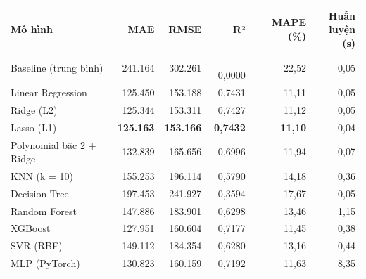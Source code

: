 \begin{tabular}{lrrrrr}
\toprule
Mô hình & MAE & RMSE & R² & MAPE (\%) & \makecell[r]{Huấn\\luyện (s)} \\
\midrule
Baseline (trung bình) & 241{.}164 & 302{.}261 & \ensuremath{-}0{,}0000 & 22{,}52 & 0{,}05 \\
Linear Regression & 125{.}450 & 153{.}188 & 0{,}7431 & 11{,}11 & 0{,}05 \\
Ridge (L2) & 125{.}344 & 153{.}311 & 0{,}7427 & 11{,}12 & 0{,}05 \\
Lasso (L1) & \textbf{125{.}163} & \textbf{153{.}166} & \textbf{0{,}7432} & \textbf{11{,}10} & 0{,}04 \\
Polynomial bậc 2 + Ridge & 132{.}839 & 165{.}656 & 0{,}6996 & 11{,}94 & 0{,}07 \\
KNN (k = 10) & 155{.}253 & 196{.}114 & 0{,}5790 & 14{,}18 & 0{,}36 \\
Decision Tree & 197{.}453 & 241{.}927 & 0{,}3594 & 17{,}67 & 0{,}05 \\
Random Forest & 147{.}886 & 183{.}901 & 0{,}6298 & 13{,}46 & 1{,}15 \\
XGBoost & 127{.}951 & 160{.}604 & 0{,}7177 & 11{,}45 & 0{,}38 \\
SVR (RBF) & 149{.}112 & 184{.}354 & 0{,}6280 & 13{,}16 & 0{,}44 \\
MLP (PyTorch) & 130{.}823 & 160{.}159 & 0{,}7192 & 11{,}63 & 8{,}35 \\
\bottomrule
\end{tabular}
